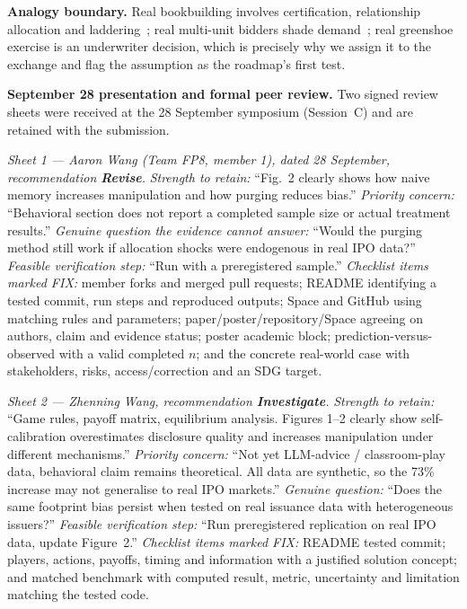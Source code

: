 \textbf{Analogy boundary.} Real bookbuilding involves certification, relationship allocation and laddering~\cite{degeorge2007}; real multi-unit bidders shade demand~\cite{ausubel2014}; real greenshoe exercise is an underwriter decision, which is precisely why we assign it to the exchange and flag the assumption as the roadmap's first test.

\textbf{September 28 presentation and formal peer review.} Two signed review sheets were received at the 28 September symposium (Session~C) and are retained with the submission.

\emph{Sheet 1 --- Aaron Wang (Team FP8, member 1), dated 28 September, recommendation \textbf{Revise}.} \emph{Strength to retain:} ``Fig.~2 clearly shows how naive memory increases manipulation and how purging reduces bias.'' \emph{Priority concern:} ``Behavioral section does not report a completed sample size or actual treatment results.'' \emph{Genuine question the evidence cannot answer:} ``Would the purging method still work if allocation shocks were endogenous in real IPO data?'' \emph{Feasible verification step:} ``Run with a preregistered sample.'' \emph{Checklist items marked FIX:} member forks and merged pull requests; README identifying a tested commit, run steps and reproduced outputs; Space and GitHub using matching rules and parameters; paper/poster/repository/Space agreeing on authors, claim and evidence status; poster academic block; prediction-versus-observed with a valid completed $n$; and the concrete real-world case with stakeholders, risks, access/correction and an SDG target.

\emph{Sheet 2 --- Zhenning Wang, recommendation \textbf{Investigate}.} \emph{Strength to retain:} ``Game rules, payoff matrix, equilibrium analysis. Figures 1--2 clearly show self-calibration overestimates disclosure quality and increases manipulation under different mechanisms.'' \emph{Priority concern:} ``Not yet LLM-advice / classroom-play data, behavioral claim remains theoretical. All data are synthetic, so the 73\% increase may not generalise to real IPO markets.'' \emph{Genuine question:} ``Does the same footprint bias persist when tested on real issuance data with heterogeneous issuers?'' \emph{Feasible verification step:} ``Run preregistered replication on real IPO data, update Figure~2.'' \emph{Checklist items marked FIX:} README tested commit; players, actions, payoffs, timing and information with a justified solution concept; and matched benchmark with computed result, metric, uncertainty and limitation matching the tested code.

